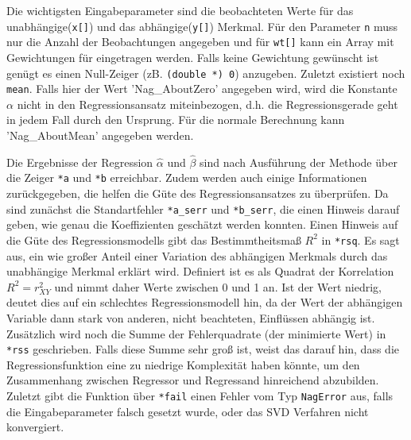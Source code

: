Die wichtigsten Eingabeparameter sind die beobachteten Werte für das unabhängige(\lstinline{x[]}) und das abhängige(\lstinline{y[]}) Merkmal.
Für den Parameter \lstinline{n} muss nur die Anzahl der Beobachtungen angegeben und für \lstinline{wt[]} kann ein Array mit Gewichtungen für eingetragen werden.   
Falls keine Gewichtung gewünscht ist genügt es einen Null-Zeiger (zB. \lstinline{(double *) 0}) anzugeben.
Zuletzt existiert noch \lstinline{mean}.
Falls hier der Wert 'Nag\_AboutZero' angegeben wird, wird die Konstante $\alpha$ nicht in den Regressionsansatz miteinbezogen, d.h. die Regressionsgerade geht in jedem Fall durch den Ursprung.
Für die normale Berechnung kann 'Nag\_AboutMean' angegeben werden.

Die Ergebnisse der Regression $\hat\alpha$ und $\hat\beta$ sind nach Ausführung der Methode über die Zeiger \lstinline{*a} und \lstinline{*b} erreichbar.
Zudem werden auch einige Informationen zurückgegeben, die helfen die Güte des Regressionsansatzes zu überprüfen.
Da sind zunächst die Standartfehler \lstinline{*a_serr} und \lstinline{*b_serr}, die einen Hinweis darauf geben, wie genau die Koeffizienten geschätzt werden konnten.
Einen Hinweis auf die Güte des Regressionsmodells gibt das Bestimmtheitsmaß $R^2$ in \lstinline{*rsq}.
Es sagt aus, ein wie großer Anteil einer Variation des abhängigen Merkmals durch das unabhängige Merkmal erklärt wird.
Definiert ist es als Quadrat der Korrelation $R^2 = r_{XY}^2$ und nimmt daher Werte zwischen 0 und 1 an.
Ist der Wert niedrig, deutet dies auf ein schlechtes Regressionsmodell hin, da der Wert der abhängigen Variable dann stark von anderen, nicht beachteten, Einflüssen abhängig ist.
Zusätzlich wird noch die Summe der Fehlerquadrate (der minimierte Wert) in \lstinline{*rss} geschrieben.
Falls diese Summe sehr groß ist, weist das darauf hin, dass die Regressionsfunktion eine zu niedrige Komplexität haben könnte, um den Zusammenhang zwischen Regressor und Regressand hinreichend abzubilden.
Zuletzt gibt die Funktion über \lstinline{*fail} einen Fehler vom Typ \lstinline{NagError} aus, falls die Eingabeparameter falsch gesetzt wurde, oder das SVD Verfahren nicht konvergiert.


